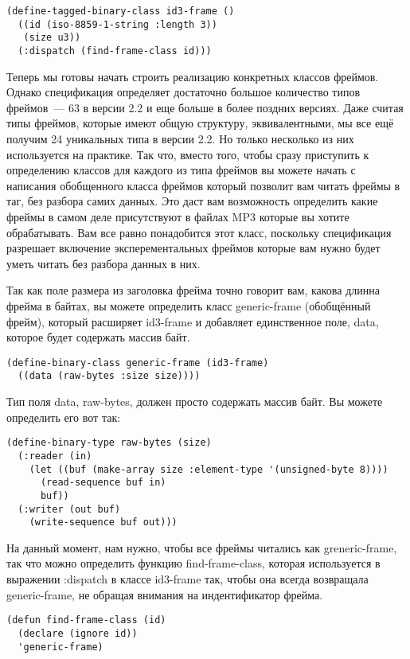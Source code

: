 \begin{lstlisting}
(define-tagged-binary-class id3-frame ()
  ((id (iso-8859-1-string :length 3))
   (size u3))
  (:dispatch (find-frame-class id)))
\end{lstlisting}

Теперь мы готовы начать строить реализацию конкретных классов фреймов.  Однако
спецификация определяет достаточно большое количество типов фреймов~--- 63 в версии 2.2 и
еще больше в более поздних версиях.  Даже считая типы фреймов, которые имеют общую
структуру, эквивалентными, мы все ещё получим 24 уникальных типа в версии 2.2.  Но только
несколько из них используется на практике.  Так что, вместо того, чтобы сразу приступить к
определению классов для каждого из типа фреймов вы можете начать с написания обобщенного
класса фреймов который позволит вам читать фреймы в таг, без разбора самих данных.  Это
даст вам возможность определить какие фреймы в самом деле присутствуют в файлах MP3
которые вы хотите обрабатывать.  Вам все равно понадобится этот класс, поскольку
спецификация разрешает включение эксперементальных фреймов которые вам нужно будет уметь
читать без разбора данных в них.

Так как поле размера из заголовка фрейма точно говорит вам, какова длинна фрейма в байтах,
вы можете определить класс generic-frame (обобщённый фрейм), который расширяет id3-frame и
добавляет единственное поле, data, которое будет содержать массив байт.

\begin{lstlisting}
(define-binary-class generic-frame (id3-frame)
  ((data (raw-bytes :size size))))
\end{lstlisting}

Тип поля data, raw-bytes, должен просто содержать массив байт. Вы можете определить его
вот так:

\begin{lstlisting}
(define-binary-type raw-bytes (size)
  (:reader (in)
    (let ((buf (make-array size :element-type '(unsigned-byte 8))))
      (read-sequence buf in)
      buf))
  (:writer (out buf)
    (write-sequence buf out)))
\end{lstlisting}

На данный момент, нам нужно, чтобы все фреймы читались как greneric-frame, так что можно
определить функцию find-frame-class, которая используется в выражении :dispatch в классе
id3-frame так, чтобы она всегда возвращала generic-frame, не обращая внимания на
индентификатор фрейма.

\begin{lstlisting}
(defun find-frame-class (id)
  (declare (ignore id))
  'generic-frame)
\end{lstlisting}

